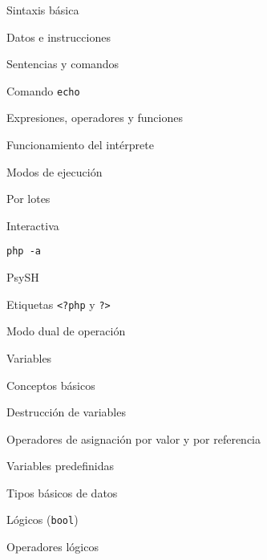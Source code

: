 \begin{longenum}
\begin{longenum}
        \item Sintaxis básica
        \begin{longenum}
            \item Datos e instrucciones
            \item Sentencias y comandos
            \begin{longenum}
                \item Comando \texttt{echo}
            \end{longenum}
            \item Expresiones, operadores y funciones
        \end{longenum}
        \item Funcionamiento del intérprete
        \begin{longenum}
            \item Modos de ejecución
            \begin{longenum}
                \item Por lotes
                \item Interactiva
                \begin{longenum}
                    \item \texttt{php -a}
                    \item PsySH
                \end{longenum}
            \end{longenum}
            \item Etiquetas \texttt{<?php} y \texttt{?>}
            \item Modo dual de operación
        \end{longenum}
        \item Variables
        \begin{longenum}
            \item Conceptos básicos
            \item Destrucción de variables
            \item Operadores de asignación por valor y por referencia
            \item Variables predefinidas
        \end{longenum}
        \item Tipos básicos de datos
        \begin{longenum}
            \item Lógicos (\texttt{bool})
            \begin{longenum}
                \item Operadores lógicos

\end{longenum}
\end{longenum}
\end{longenum}
\end{longenum}
